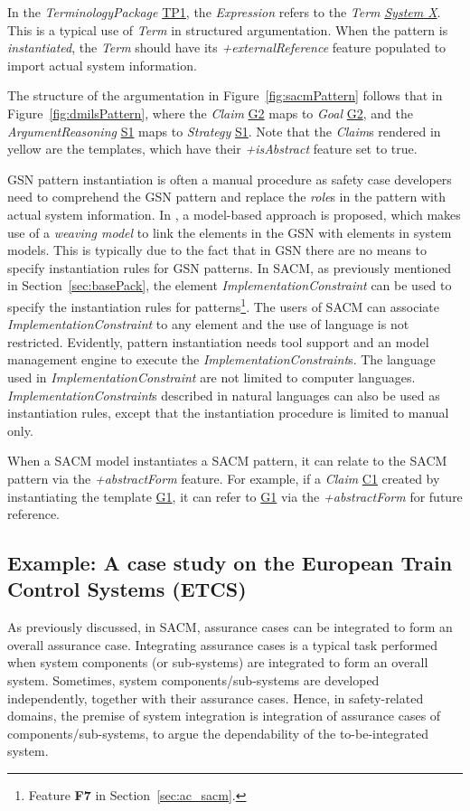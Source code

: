 In the \textit{TerminologyPackage} \underline{TP1}, the \textit{Expression} refers to the \textit{Term} \underline{\textit{System X}}. 
This is a typical use of \textit{Term} in structured argumentation. 
When the pattern is \textit{instantiated}, the \textit{Term} should have its \textit{+externalReference} feature populated to import actual system information. 

The structure of the argumentation in Figure~\ref{fig:sacmPattern} follows that in Figure~\ref{fig:dmilsPattern}, where the \textit{Claim} \underline{G2} maps to \textit{Goal} \underline{G2}, and the \textit{ArgumentReasoning} \underline{S1} maps to \textit{Strategy} \underline{S1}. 
Note that the \textit{Claim}s rendered in yellow are the templates, which have their \textit{+isAbstract} feature set to true. 

GSN pattern instantiation is often a manual procedure as safety case developers need to comprehend the GSN pattern and replace the \textit{role}s in the pattern with actual system information. In \cite{hawkins2015weaving}, a model-based approach is proposed, which makes use of a \textit{weaving model} to link the elements in the GSN with elements in system models. 
This is typically due to the fact that in GSN there are no means to specify instantiation rules for GSN patterns.
In SACM, as previously mentioned in Section~\ref{sec:basePack}, the element \textit{ImplementationConstraint} can be used to specify the instantiation rules for patterns\footnote{Feature \textbf{F7} in Section~\ref{sec:ac_sacm}.}. 
The users of SACM can associate \textit{ImplementationConstraint} to any element and the use of language is not restricted.
Evidently, pattern instantiation needs tool support and an model management engine to execute the \textit{ImplementationConstraint}s. 
The language used in \textit{ImplementationConstraint} are not limited to computer languages.
\textit{ImplementationConstraint}s described in natural languages can also be used as instantiation rules, except that the instantiation procedure is limited to manual only. 

When a SACM model instantiates a SACM pattern, it can relate to the SACM pattern via the \textit{+abstractForm} feature. 
For example, if a \textit{Claim} \underline{C1} created by instantiating the template \underline{G1}, it can refer to \underline{G1} via the \textit{+abstractForm} for future reference. 

\subsection{Example: A case study on the European Train Control Systems (ETCS)}
\label{section:etcs}
As previously discussed, in SACM, assurance cases can be integrated to form an overall assurance case. 
Integrating assurance cases is a typical task performed when system components (or sub-systems) are integrated to form an overall system. 
Sometimes, system components/sub-systems are developed independently, together with their assurance cases. 
Hence, in safety-related domains, the premise of system integration is integration of assurance cases of components/sub-systems, to argue the dependability of the to-be-integrated system.

